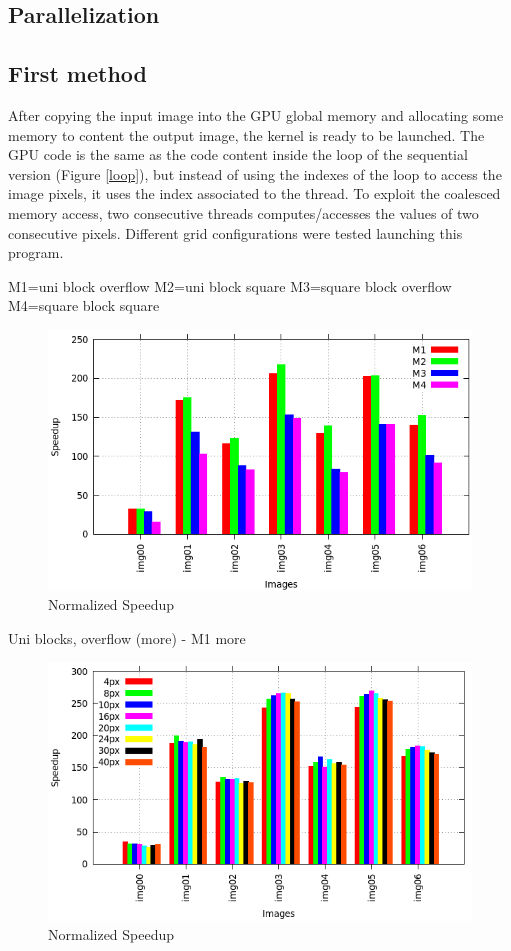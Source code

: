 \documentclass[a4paper]{article}
\begin{document}
\subsection{Parallelization}
\label{sec:p1}
\subsection{First method}
\label{sec:fm}
After copying the input image into the GPU global memory and allocating some memory to content the output image, the kernel is ready to be launched. The GPU code is the same as the code content inside the loop of the sequential version (Figure \ref{loop}), but instead of using the indexes of the loop to access the image pixels, it uses the index associated to the thread. To exploit the coalesced memory access, two consecutive threads computes/accesses the values of two consecutive pixels. Different grid configurations were tested launching this program. 


M1=uni block overflow M2=uni block square M3=square block overflow M4=square block square
\begin{figure}[ht]
    \centering
    \includegraphics[width=0.9\linewidth]{res/darker_histo}
    \caption{Normalized Speedup}
    \label{fig:histo_darker}
\end{figure}
\FloatBarrier

Uni blocks, overflow (more) - M1 more
\begin{figure}[ht]
    \centering
    \includegraphics[width=0.9\linewidth]{res/darker_try_histo}
    \caption{Normalized Speedup}
    \label{fig:norm_histo_darker}
\end{figure}
\FloatBarrier
\end{document}
